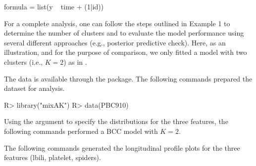 \begin{example}
     		formula = list(y ~ time + (1|id))
\end{example} 

For a complete analysis, one can follow the steps outlined in Example 1 to determine the number of clusters and to evaluate the model performance using several different approaches (e.g., posterior predictive check). Here, as an illustration, and for the purpose of comparison, we only fitted a model with two clusters (i.e., $K=2$) as in \citet{Komarek2013}. 

The data is available through the  package. The following commands prepared the dataset for analysis.

\begin{example}
R> library("mixAK")
R> data(PBC910)
\end{example} 

Using the argument  to specify the distributions for the three features, the following commands performed a BCC model with $K=2$.


The following commands generated the longitudinal profile plots for the three features (lbili, platelet, spiders). 

